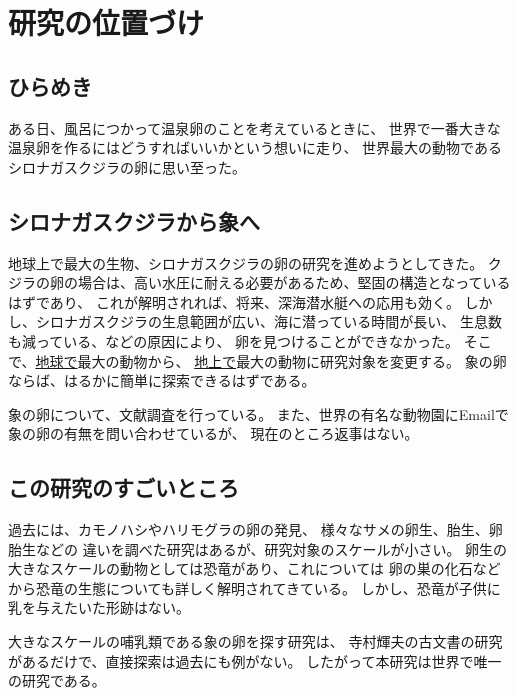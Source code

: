\documentclass[11pt,a4j,dvipdfmx]{jarticle} 					%
\newcommand{\研究課題名}{象の卵}
\newcommand{\研究機関名}{逢坂大学}
\newcommand{\研究代表者氏名}{湯川秀樹}
\begin{document}

\section{研究の位置づけ}

\subsection{ひらめき}
ある日、風呂につかって温泉卵のことを考えているときに、
世界で一番大きな温泉卵を作るにはどうすればいいかという想いに走り、
世界最大の動物であるシロナガスクジラの卵に思い至った。

\subsection{シロナガスクジラから象へ}
\label{sec:whale}
地球上で最大の生物、シロナガスクジラの卵の研究を進めようとしてきた。
クジラの卵の場合は、高い水圧に耐える必要があるため、堅固の構造となっているはずであり、
これが解明されれば、将来、深海潜水艇への応用も効く。
しかし、シロナガスクジラの生息範囲が広い、海に潜っている時間が長い、
生息数も減っている、などの原因により、
卵を見つけることができなかった。
そこで、\underline{地球で}最大の動物から、
\underline{地上で}最大の動物に研究対象を変更する。
象の卵ならば、はるかに簡単に探索できるはずである。

	象の卵について、文献調査を行っている。
	また、世界の有名な動物園にEmailで象の卵の有無を問い合わせているが、
	現在のところ返事はない。

\subsection{この研究のすごいところ}
	過去には、カモノハシやハリモグラの卵の発見、
	様々なサメの卵生、胎生、卵胎生などの
	違いを調べた研究はあるが、研究対象のスケールが小さい。
	卵生の大きなスケールの動物としては恐竜があり、これについては
	卵の巣の化石などから恐竜の生態についても詳しく解明されてきている。
	しかし、恐竜が子供に乳を与えたいた形跡はない。
	
	大きなスケールの哺乳類である象の卵を探す研究は、
	寺村輝夫の古文書の研究があるだけで、直接探索は過去にも例がない。
	したがって本研究は世界で唯一の研究である。
\end{document}
